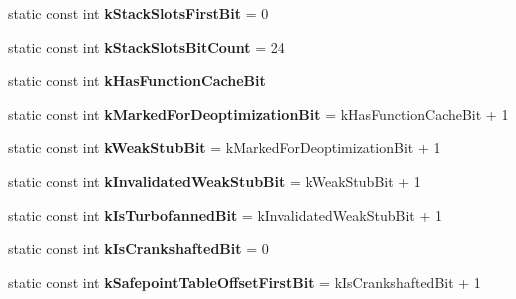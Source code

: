 \begin{DoxyCompactItemize}
\item 
\hypertarget{classv8_1_1internal_1_1_code_a03a270ff255c59702aa8358d304951c3}{}static const int {\bfseries k\+Stack\+Slots\+First\+Bit} = 0\label{classv8_1_1internal_1_1_code_a03a270ff255c59702aa8358d304951c3}

\item 
\hypertarget{classv8_1_1internal_1_1_code_af38fae3df9a17adb0c9e17400c98aa61}{}static const int {\bfseries k\+Stack\+Slots\+Bit\+Count} = 24\label{classv8_1_1internal_1_1_code_af38fae3df9a17adb0c9e17400c98aa61}

\item 
static const int {\bfseries k\+Has\+Function\+Cache\+Bit}
\item 
\hypertarget{classv8_1_1internal_1_1_code_a407472d202e070f89c3bd23a485d67be}{}static const int {\bfseries k\+Marked\+For\+Deoptimization\+Bit} = k\+Has\+Function\+Cache\+Bit + 1\label{classv8_1_1internal_1_1_code_a407472d202e070f89c3bd23a485d67be}

\item 
\hypertarget{classv8_1_1internal_1_1_code_a9a15128f9107628c3cff09d3002fb999}{}static const int {\bfseries k\+Weak\+Stub\+Bit} = k\+Marked\+For\+Deoptimization\+Bit + 1\label{classv8_1_1internal_1_1_code_a9a15128f9107628c3cff09d3002fb999}

\item 
\hypertarget{classv8_1_1internal_1_1_code_a4b64277e3490deb90f3a50d7f8b437b2}{}static const int {\bfseries k\+Invalidated\+Weak\+Stub\+Bit} = k\+Weak\+Stub\+Bit + 1\label{classv8_1_1internal_1_1_code_a4b64277e3490deb90f3a50d7f8b437b2}

\item 
\hypertarget{classv8_1_1internal_1_1_code_a2fb5e36f79d2194b5ea3d032c48a817b}{}static const int {\bfseries k\+Is\+Turbofanned\+Bit} = k\+Invalidated\+Weak\+Stub\+Bit + 1\label{classv8_1_1internal_1_1_code_a2fb5e36f79d2194b5ea3d032c48a817b}

\item 
\hypertarget{classv8_1_1internal_1_1_code_ac60d8a948757ebf178d6a8e92d7808f1}{}static const int {\bfseries k\+Is\+Crankshafted\+Bit} = 0\label{classv8_1_1internal_1_1_code_ac60d8a948757ebf178d6a8e92d7808f1}

\item 
\hypertarget{classv8_1_1internal_1_1_code_ac4e59439f2a880983728c9b63a00108d}{}static const int {\bfseries k\+Safepoint\+Table\+Offset\+First\+Bit} = k\+Is\+Crankshafted\+Bit + 1\label{classv8_1_1internal_1_1_code_ac4e59439f2a880983728c9b63a00108d}


\end{DoxyCompactItemize}
